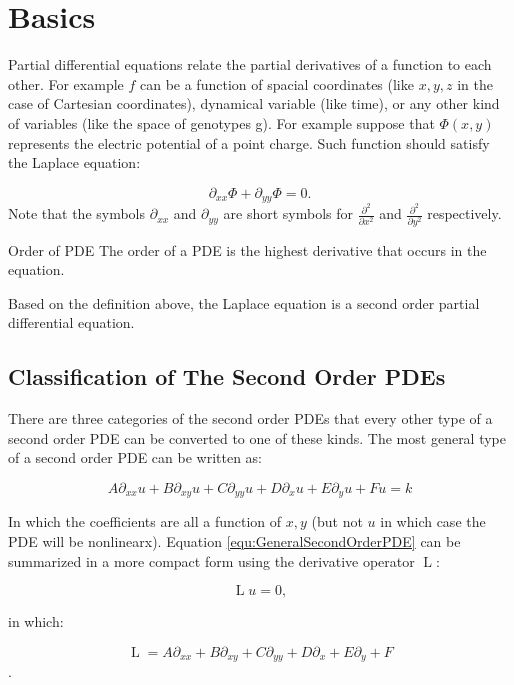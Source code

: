 \section{Basics}
Partial differential equations relate the partial derivatives of a function to each other. For example $f$ can be a function of spacial coordinates (like $x,y,z$ in the case of Cartesian coordinates), dynamical variable (like time), or any other kind of variables (like the space of genotypes g). For example suppose that $ \Phi(x,y) $ represents the electric potential of a point charge. Such function should satisfy the Laplace equation:

\[	 \partial_{xx} \Phi + \partial_{yy} \Phi = 0.	\]
Note that the symbols $ \partial_{xx} $ and $ \partial_{yy} $ are short symbols for $ \frac{\partial^2}{\partial x^2} $ and $ \frac{\partial^2}{\partial y^2} $ respectively.

\begin{defbox}{Order of PDE}
	The order of a PDE is the highest derivative that occurs in the equation. 
\end{defbox}

Based on the definition above, the Laplace equation is a second order partial differential equation. 

\subsection{Classification of The Second Order PDEs }

There are three categories of the second order PDEs that every other type of a second order PDE can be converted to one of these kinds. The most general type of a second order PDE can be written as:

\begin{equation}
	A \partial_{xx} u + B \partial_{xy} u + C \partial_{yy} u + D \partial_{x} u + E \partial_{y} u + F u = k
	\label{equ:GeneralSecondOrderPDE}
\end{equation}

In which the coefficients are all a function of $x,y$ (but not $ u $ in which case the PDE will be nonlinearx). Equation \ref{equ:GeneralSecondOrderPDE} can be summarized in a more compact form using the derivative operator $ \operatorname{L} $: 

\[	 \operatorname{L} u = 0,	\]

in which:

\[  \operatorname{L} = A \partial_{xx} + B \partial_{xy} + C \partial_{yy} + D \partial_{x} + E \partial_{y} + F \].

